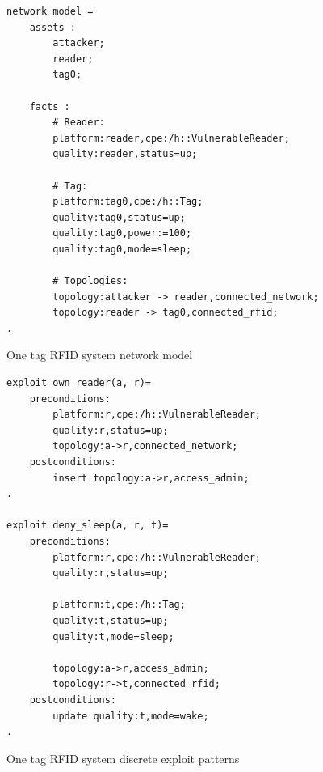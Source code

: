 \begin{figure}
\begin{lstlisting}
network model = 
    assets :
        attacker;
        reader;
        tag0;
    
    facts :
        # Reader:
        platform:reader,cpe:/h::VulnerableReader;
        quality:reader,status=up;
        
        # Tag:
        platform:tag0,cpe:/h::Tag;
        quality:tag0,status=up;
        quality:tag0,power:=100;
        quality:tag0,mode=sleep;
        
        # Topologies:
        topology:attacker -> reader,connected_network;
        topology:reader -> tag0,connected_rfid;
.
\end{lstlisting}
\caption{One tag RFID system network model}
\label{fig:rfid1_nm}
\end{figure}

\begin{figure}
\begin{lstlisting}
exploit own_reader(a, r)=
    preconditions:
        platform:r,cpe:/h::VulnerableReader;
        quality:r,status=up;
        topology:a->r,connected_network;
    postconditions:
        insert topology:a->r,access_admin;
.

exploit deny_sleep(a, r, t)=
    preconditions:
        platform:r,cpe:/h::VulnerableReader;
        quality:r,status=up;
        
        platform:t,cpe:/h::Tag;
        quality:t,status=up;
        quality:t,mode=sleep;
        
        topology:a->r,access_admin;
        topology:r->t,connected_rfid;
    postconditions:
        update quality:t,mode=wake;
.
\end{lstlisting}
\caption{One tag RFID system discrete exploit patterns}
\label{fig:rfid1_xp1}
\end{figure}



